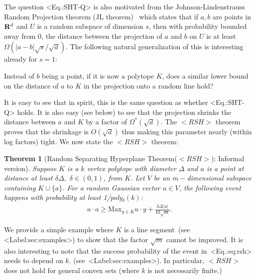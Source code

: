 \documentclass[11pt,letterpaper]{article}
\newcounter{note}[section]
\def\\{}%
\def\mathsf#1{<#1>}%
\def\xspace{}%
\def\Cref#1{<Label:#1>}%
\def\eqref#1{<Eq.:#1>}%
\newtheorem{theorem}{Theorem}[section]
\theoremstyle{definition}
\theoremstyle{remark}
\newcommand{\rsh}{{\mathsf {RSH}}\xspace}
\begin{document}
The question \eqref{SHT-Q} is also motivated from the Johnson-Lindenstrauss Random Projection theorem (JL theorem)~\cite{jl} which states that if $a,b$ are points in ${\bf R}^d$ and $U$ is a random subspace of dimension $s$, then with probability bounded away from 0, the distance between the projection of $a$ and $b$ on $U$ is at least 
 $\Omega(|a-b|\sqrt s/\sqrt d)$. 
 The following natural generalization of this is interesting already for $s=1$: 

Instead of $b$ being a point, if it is now a polytope $K$, does a  similar lower bound on the distance of $a$ to $K$ in the projection onto a random line hold?  

It is easy to see that in spirit, this is the same question as whether \eqref{SHT-Q} holds.
It is also easy (see below) to see that the projection shrinks the distance between $a$ and $K$ by a factor of $\Omega^*(\sqrt d)$. 
The $\rsh$ theorem proves that the shrinkage is $O(\sqrt d)$ thus making this parameter nearly (within log factors) tight. We now state  the $\rsh$ theorem:
\begin{theorem}
[Random Separating Hyperplane Theorem($\rsh$): Informal version]  
\label{rsh-0} Suppose $K$ is a $k$ vertex polytope with diameter $\Delta$ and $a$ is a point at distance at least $\delta\Delta,$ $\delta\in (0,1)$, from 
$K$. Let $V$ be an $m-$dimensional subspace containing $K\cup \{ a\}$. For a random Gaussian vector $u\in V$, the following event happens with probability  at least 
1/poly$_\delta (k)$:
\begin{align}
\label{eq:rsh}
u\cdot a\geq \mbox{Max}_{y\in K}u\cdot y + \frac{\delta \Delta |u|}{10\sqrt m}.
\end{align}
\end{theorem}
We provide a simple example where $K$ is a line segment~(see \Cref{sec:examples}) to show that the factor $\sqrt m$ cannot be improved. It is also interesting to note that the success probability of the event in~\eqref{eq:rsh} needs to depend on $k$. 
(see~\Cref{sec:examples}).
In particular, $\rsh$ does not hold for general convex sets (where $k$ is not necessarily finite.) \\
\end{document}
